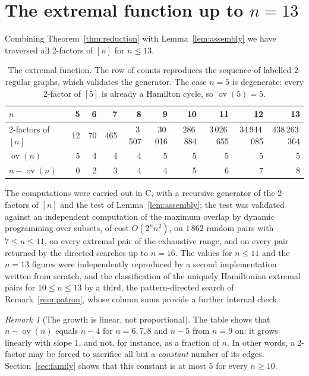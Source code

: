 \documentclass[11pt,a4paper]{article}
\theoremstyle{definition}
\theoremstyle{remark}
\newtheorem{remark}[theorem]{Remark}
\newcommand{\ov}{\operatorname{ov}}
\begin{document}
\section{The extremal function up to \texorpdfstring{$n=13$}{n=13}}\label{sec:exact}

Combining Theorem~\ref{thm:reduction} with Lemma~\ref{lem:assembly} we have traversed all 2-factors of $[n]$ for $n\le13$.

\begin{table}[h]
\centering\small
\setlength{\tabcolsep}{4.5pt}
\begin{tabular}{lrrrrrrrrr}
\toprule
$n$ & 5 & 6 & 7 & 8 & 9 & 10 & 11 & 12 & 13\\
\midrule
2-factors of $[n]$ & 12 & 70 & 465 & 3\,507 & 30\,016 & 286\,884 & 3\,026\,655 & 34\,944\,085 & 438\,263\,364\\
$\ov(n)$ & 5 & 4 & 4 & 4 & 5 & 5 & 5 & 5 & 5\\
$n-\ov(n)$ & 0 & 2 & 3 & 4 & 4 & 5 & 6 & 7 & 8\\
\bottomrule
\end{tabular}
\caption{The extremal function. The row of counts reproduces the sequence of labelled $2$-regular graphs, which validates the generator. The case $n=5$ is degenerate: every 2-factor of $[5]$ is already a Hamilton cycle, so $\ov(5)=5$.}\label{tab:ov}
\end{table}

The computations were carried out in C, with a recursive generator of the 2-factors of $[n]$ and the test of Lemma~\ref{lem:assembly}; the test was validated against an independent computation of the maximum overlap by dynamic programming over subsets, of cost $O(2^n n^2)$, on $1\,862$ random pairs with $7\le n\le11$, on every extremal pair of the exhaustive range, and on every pair returned by the directed searches up to $n=16$. The values for $n\le11$ and the $n=13$ figures were independently reproduced by a second implementation written from scratch, and the classification of the uniquely Hamiltonian extremal pairs for $10\le n\le13$ by a third, the pattern-directed search of Remark~\ref{rem:patron}, whose column sums provide a further internal check.

\begin{remark}[The growth is linear, not proportional]\label{rem:growth}
The table shows that $n-\ov(n)$ equals $n-4$ for $n=6,7,8$ and $n-5$ from $n=9$ on: it grows linearly with slope $1$, and not, for instance, as a fraction of $n$. In other words, a 2-factor may be forced to sacrifice all but a \emph{constant} number of its edges. Section~\ref{sec:family} shows that this constant is at most $5$ for every $n\ge10$.
\end{remark}
\end{document}
